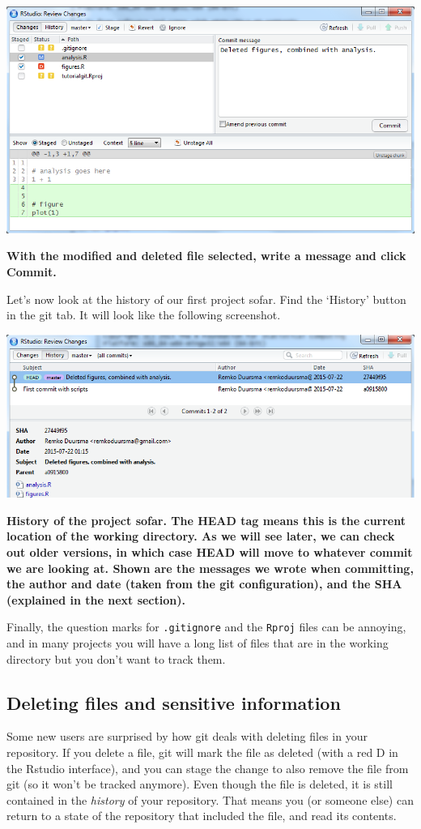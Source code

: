 \documentclass[]{book}
\begin{document}
\includegraphics[width=0.75\linewidth]{screenshots/secondcommit}

\textbf{With the modified and deleted file selected, write a message and click Commit.}

Let's now look at the history of our first project sofar. Find the `History' button in the git tab. It will look like the following screenshot.

\includegraphics[width=0.75\linewidth]{screenshots/firsthistory}

\textbf{History of the project sofar. The HEAD tag means this is the current location of the working directory. As we will see later, we can check out older versions, in which case HEAD will move to whatever commit we are looking at. Shown are the messages we wrote when committing, the author and date (taken from the git configuration), and the SHA (explained in the next section).}

Finally, the question marks for \texttt{.gitignore} and the \texttt{Rproj} files can be annoying, and in many projects you will have a long list of files that are in the working directory but you don't want to track them.

\hypertarget{deleting-files-and-sensitive-information}{%
\subsection{Deleting files and sensitive information}\label{deleting-files-and-sensitive-information}}

Some new users are surprised by how git deals with deleting files in your repository. If you delete a file, git will mark the file as deleted (with a red D in the Rstudio interface), and you can stage the change to also remove the file from git (so it won't be tracked anymore). Even though the file is deleted, it is still contained in the \emph{history} of your repository. That means you (or someone else) can return to a state of the repository that included the file, and read its contents.
\end{document}
